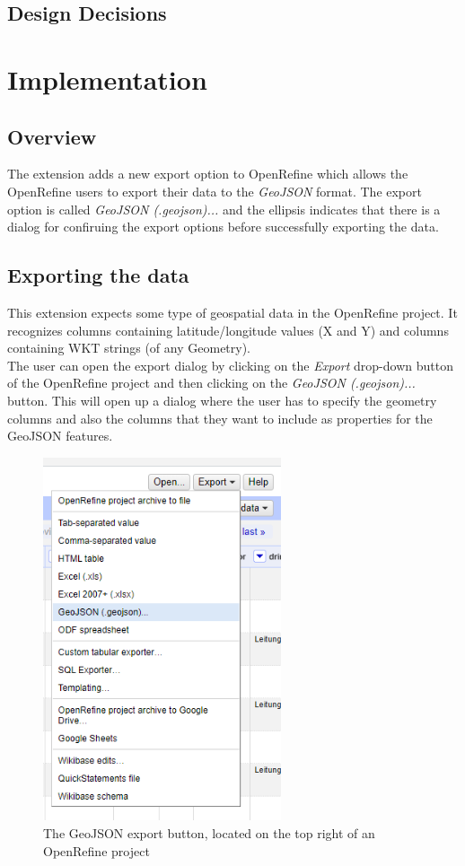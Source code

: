 \subsection{Design Decisions}
\lipsum[18-20]
\pagebreak
\section{Implementation}
\subsection{Overview}
The extension adds a new export option to OpenRefine which allows the OpenRefine users to
export their data to the \textit{GeoJSON} format. The export option is called \textit{GeoJSON (.geojson)...} and the ellipsis
indicates that there is a dialog for confiruing the export options before successfully exporting the data.
\subsection{Exporting the data}
This extension expects some type of geospatial data in the OpenRefine project.
It recognizes columns containing latitude/longitude values (X and Y) and columns containing WKT strings (of any Geometry).\\
\newline
The user can open the export dialog by clicking on the \textit{Export} drop-down button of the OpenRefine project and then clicking
on the \textit{GeoJSON (.geojson)...} button.
This will open up a dialog where the user has to specify the geometry columns and also the columns that they want to
include as properties for the GeoJSON features.\\
\newline

\begin{figure}[H]
    \includegraphics[width=7cm]{./Figures/GeoJSON_Export/geojson_export_button.png}
    \caption{The GeoJSON export button, located on the top right of an OpenRefine project}
\end{figure}


